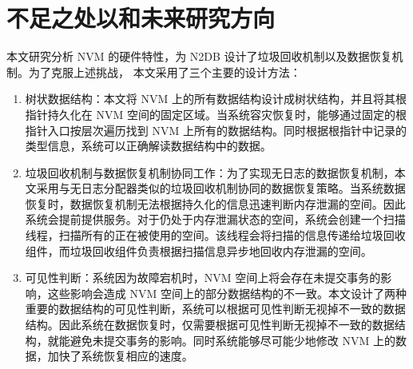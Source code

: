 \section{不足之处以和未来研究方向}

本文研究分析 NVM 的硬件特性，为 N2DB 设计了垃圾回收机制以及数据恢复机制。为了克服上述挑战， 本文采用了三个主要的设计方法：

\begin{enumerate}
    \item 树状数据结构：本文将 NVM 上的所有数据结构设计成树状结构，并且将其根指针持久化在 NVM 空间的固定区域。当系统容灾恢复时，能够通过固定的根指针入口按层次遍历找到 NVM 上所有的数据结构。同时根据根指针中记录的类型信息，系统可以正确解读数据结构中的数据。
    \item 垃圾回收机制与数据恢复机制协同工作：为了实现无日志的数据恢复机制，本文采用与无日志分配器类似的垃圾回收机制协同的数据恢复策略。当系统数据恢复时，数据恢复机制无法根据持久化的信息迅速判断内存泄漏的空间。因此系统会提前提供服务。对于仍处于内存泄漏状态的空间，系统会创建一个扫描线程，扫描所有的正在被使用的空间。该线程会将扫描的信息传递给垃圾回收组件，而垃圾回收组件负责根据扫描信息异步地回收内存泄漏的空间。
    \item 可见性判断：系统因为故障宕机时，NVM 空间上将会存在未提交事务的影响，这些影响会造成 NVM 空间上的部分数据结构的不一致。本文设计了两种重要的数据结构的可见性判断，系统可以根据可见性判断无视掉不一致的数据结构。因此系统在数据恢复时，仅需要根据可见性判断无视掉不一致的数据结构，就能避免未提交事务的影响。同时系统能够尽可能少地修改 NVM 上的数据，加快了系统恢复相应的速度。
\end{enumerate}


